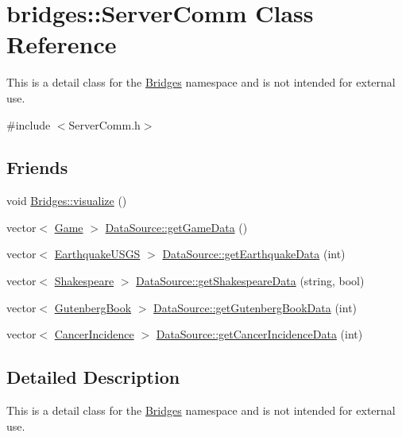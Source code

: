\hypertarget{classbridges_1_1_server_comm}{}\section{bridges\+:\+:Server\+Comm Class Reference}
\label{classbridges_1_1_server_comm}


This is a detail class for the \hyperlink{namespacebridges_1_1_bridges}{Bridges} namespace and is not intended for external use.  




{\ttfamily \#include $<$Server\+Comm.\+h$>$}

\subsection*{Friends}
\begin{DoxyCompactItemize}
\item 
void \hyperlink{classbridges_1_1_server_comm_a0a9e3be9faab475909293766dcda4779}{Bridges\+::visualize} ()
\item 
vector$<$ \hyperlink{classbridges_1_1_game}{Game} $>$ \hyperlink{classbridges_1_1_server_comm_aaf9715981dcd976f93624bd3aa22183f}{Data\+Source\+::get\+Game\+Data} ()
\item 
vector$<$ \hyperlink{classbridges_1_1_earthquake_u_s_g_s}{Earthquake\+U\+S\+G\+S} $>$ \hyperlink{classbridges_1_1_server_comm_a29b51cd765158c2022cdf624302a6f41}{Data\+Source\+::get\+Earthquake\+Data} (int)
\item 
vector$<$ \hyperlink{classbridges_1_1_shakespeare}{Shakespeare} $>$ \hyperlink{classbridges_1_1_server_comm_a1f240eea3d39812606c0b3d10bdc757c}{Data\+Source\+::get\+Shakespeare\+Data} (string, bool)
\item 
vector$<$ \hyperlink{classbridges_1_1_gutenberg_book}{Gutenberg\+Book} $>$ \hyperlink{classbridges_1_1_server_comm_a8daad6bf2db8bf4f0b0f9914022b6aa4}{Data\+Source\+::get\+Gutenberg\+Book\+Data} (int)
\item 
vector$<$ \hyperlink{classbridges_1_1_cancer_incidence}{Cancer\+Incidence} $>$ \hyperlink{classbridges_1_1_server_comm_a206da9499372409063d2abe5d1e9bce0}{Data\+Source\+::get\+Cancer\+Incidence\+Data} (int)
\end{DoxyCompactItemize}


\subsection{Detailed Description}
This is a detail class for the \hyperlink{namespacebridges_1_1_bridges}{Bridges} namespace and is not intended for external use. 

